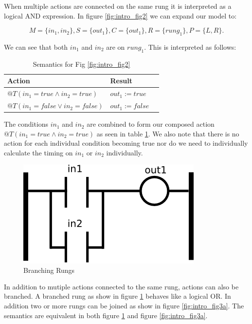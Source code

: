 When multiple actions are connected on the same rung it is interpreted as a logical AND 
expression. In figure \ref{fig:intro_fig2} we can expand our model to:

$$M=\lbrace in_1, in_2 \rbrace, S=\lbrace out_1 \rbrace, C=\lbrace out_1 \rbrace, R=\lbrace rung_1 \rbrace, P=\lbrace L,R \rbrace.$$

We can see that both $in_1$ and $in_2$ are on $rung_1$. This is interpreted as follows:

\begin{table}[htp]
    \centering
       \begin{tabular}{|l|l|l|}
        \hline
        Action & Result \\
        \hline
        $@T(in_1 = true \wedge in_2 = true)$ & $out_1 := true$ \\
        \hline
        $@T(in_1 = false \vee in_2 = false)$ & $out_1 := false$ \\
        \hline
    \end{tabular}
    \caption{Semantics for Fig \ref{fig:intro_fig2}}
    \label{table:table_for_fig2}
\end{table}

The conditions $in_1$ and $in_2$ are combined to form our composed action $@T(in_1 = true \wedge in_2 = true)$ 
as seen in table \ref{table:table_for_fig2}. We also note that there is no action for each individual condition
becoming true nor do we need to individually calculate the timing on $in_1$ or $in_2$ individually.

\begin{figure}[htp]
    \centering
    \includegraphics[width=\imgsmall]{./images/intro_fig3.png}
    \caption{Branching Rungs}
    \label{fig:intro_fig3}
\end{figure}


In addition to mutiple actions connected to the same rung, actions can also be branched. A branched rung as
show in figure \ref{fig:intro_fig3} behaves like a logical OR. In addition two or more rungs can be joined
as show in figure \ref{fig:intro_fig3a}. The semantics are equivalent in both figure \ref{fig:intro_fig3} and 
figure \ref{fig:intro_fig3a}.

